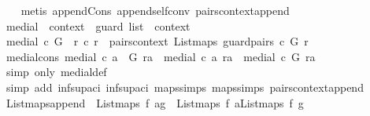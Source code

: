 \begin{isabellebody}
%
\isadelimproof
\ \ %
\endisadelimproof
%
\isatagproof
{}\isamarkupfalse%
\ {\isacharparenleft}metis\ append{\isacharunderscore}Cons\ append{\isacharunderscore}self{\isacharunderscore}conv{}\ pairs{}context{\isacharunderscore}append{\isacharparenright}%
\endisatagproof
{\isafoldproof}%
%
\isadelimproof
\isanewline
%
\endisadelimproof
\isanewline
{}\isamarkupfalse%
\ medial\ {\isacharcolon}{\isacharcolon}\ {\isachardoublequoteopen}context\ {\isasymRightarrow}\ guard\ list\ {\isasymRightarrow}\ context{\isachardoublequoteclose}\ \isanewline
\ {\isachardoublequoteopen}medial\ c\ G\ {\isacharequal}\ {\isacharparenleft}{\isasymlambda}r{\isachardot}\ {\isacharparenleft}c\ r{\isacharparenright}\ {\isacharbar}{\isasymunion}{\isacharbar}\ pairs{}context\ {\isacharparenleft}List{\isachardot}maps\ {\isacharparenleft}guard{}pairs\ c{\isacharparenright}\ G{\isacharparenright}\ r{\isacharparenright}{\isachardoublequoteclose}\isanewline
\isanewline
{}\isamarkupfalse%
\ medial{\isacharunderscore}cons{\isacharcolon}\ {\isachardoublequoteopen}medial\ c\ {\isacharparenleft}a\ {\isacharhash}\ G{\isacharparenright}\ ra\ {\isacharequal}\ medial\ c\ {\isacharbrackleft}a{\isacharbrackright}\ ra\ {\isacharbar}{\isasymunion}{\isacharbar}\ medial\ c\ G\ ra{\isachardoublequoteclose}\isanewline
%
\isadelimproof
\ \ %
\endisadelimproof
%
\isatagproof
{}\isamarkupfalse%
\ {\isacharparenleft}simp\ only{\isacharcolon}\ medial{\isacharunderscore}def{\isacharparenright}\isanewline
\ \ \isamarkupfalse%
\ {\isacharparenleft}simp\ add{\isacharcolon}\ inf{\isacharunderscore}sup{\isacharunderscore}aci{\isacharparenleft}{}{\isacharparenright}\ inf{\isacharunderscore}sup{\isacharunderscore}aci{\isacharparenleft}{}{\isacharparenright}\ maps{\isacharunderscore}simps{\isacharparenleft}{}{\isacharparenright}\ maps{\isacharunderscore}simps{\isacharparenleft}{}{\isacharparenright}\ pairs{}context{\isacharunderscore}append{\isacharparenright}%
\endisatagproof
{\isafoldproof}%
%
\isadelimproof
\isanewline
%
\endisadelimproof
\isanewline
{}\isamarkupfalse%
\ List{\isacharunderscore}maps{\isacharunderscore}append{\isacharcolon}\ \ {\isachardoublequoteopen}List{\isachardot}maps\ f\ {\isacharparenleft}a{\isacharat}g{\isacharparenright}\ {\isacharequal}\ {\isacharparenleft}List{\isachardot}maps\ f\ a{\isacharparenright}{\isacharat}{\isacharparenleft}List{\isachardot}maps\ f\ g{\isacharparenright}{\isachardoublequoteclose}\isanewline

\end{isabellebody}
